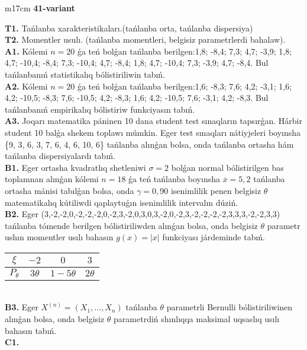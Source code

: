 \documentclass{article}
\begin{document}
\begin{tabular}{m{17cm}}
\textbf{41-variant}
\newline

\textbf{T1.} 
Tańlanba xarakteristikaları.(tańlanba orta, tańlanba dispersiya)
 \\
\textbf{T2.} 
Momentler usulı. (tańlanba momentleri, belgisiz parametrlerdi bahalaw).
 \\
\textbf{A1.} 
Kólemi \(n = 20\) ǵa teń bolǵan tańlanba berilgen:1,8; -8,4; 7,3; 4,7; -3,9; 1,8; 4,7; -10,4; -8,4; 7,3; -10,4; 4,7; -8,4; 1,8; 4,7; -10,4; 7,3; -3,9; 4,7; -8,4. Bul tańlanbanıń statistikalıq bólistiriliwin tabıń.
 \\
\textbf{A2.} 
Kólemi \(n = 20\) ǵa teń bolǵan tańlanba berilgen:1,6; -8,3; 7,6; 4,2; -3,1; 1,6; 4,2; -10,5; -8,3; 7,6; -10,5; 4,2; -8,3; 1,6; 4,2; -10,5; 7,6; -3,1; 4,2; -8,3. Bul tańlanbanıń empirikalıq bólistiriw funkciyasın tabıń.
 \\
\textbf{A3.} 
Joqarı matematika páninen 10 dana student test sınaqların tapsırǵan. Hárbir student 10 balǵa shekem toplawı múmkin. Eger test sınaqları nátiyjeleri boyınsha \{9, 3, 6, 3, 7, 6, 4, 6, 10, 6\} tańlanba alınǵan bolsa, onda tańlanba ortasha hám tańlanba dispersiyalardı tabıń.
 \\
\textbf{B1.} 
Eger ortasha kvadratlıq shetleniwi \(\sigma = 2\) bolǵan normal bólistirilgen bas toplamnan alınǵan kólemi \(n = 18\) ǵa teń tańlanba boyınsha \(\overline{x} = 5,2\) tańlanba ortasha mánisi tabılǵan bolsa, onda \(\gamma = 0,90\) isenimlilik penen belgisiz \(\theta\) matematikalıq kútiliwdi qaplaytuǵın isenimlilik intervalın dúziń.
 \\
\textbf{B2.} 
Eger (3,-2,-2,0,-2,-2,-2,0,-2,3,-2,0,3,0,3,-2,0,-2,3,-2,-2,-2,-2,3,3,3,-2,-2,3,3) tańlanba tómende berilgen bólistiriliwden alınǵan bolsa, onda belgisiz \(\theta\) parametr ushın momentler usılı bahasın \(g(x) = |x|\) funkciyası járdeminde tabıń.
\begin{tabular}{|c|c|c|c|}
  \hline
$\xi$ &
$- 2$ &
$0$ &
$3$ \\
\hline
\(P_{\theta}\) & \(3\theta\) & \(1 - 5\theta\) & \(2\theta\) \\
\hline
\end{tabular}
 \\
\textbf{B3.} 
Eger \(X^{(n)} = \left( X_{1},...,X_{n} \right)\) tańlanba \(\theta\) parametrli Bernulli bólistiriliwinen alınǵan bolsa, onda belgisiz \(\theta\) parametrdiń shınlıqqa maksimal uqsaslıq usılı bahasın tabıń.
 \\
\textbf{C1.} 

\end{tabular}
\end{document}
